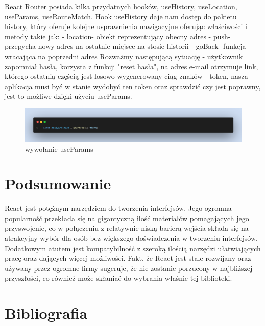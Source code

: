 \documentclass[oneside,polski,logo,indent]{amuthesis}
\begin{document}
\begin{enumerate}
\begin{enumerate}
\begin{figure}[H]
\end{figure}

React Router posiada kilka przydatnych hooków, useHistory, useLocation, useParams, useRouteMatch. Hook useHistory daje nam dostęp do pakietu history, który oferuje kolejne usprawnienia 
nawigacyjne oferując właściwości i metody takie jak:
\newline - location- obiekt reprezentujący obecny adres
\newline - push- przepycha nowy adres na ostatnie miejsce na stosie historii
\newline - goBack- funkcja wracająca na poprzedni adres
\newline
Rozważmy następującą sytuację - użytkownik zapomniał hasła, korzysta z funkcji "reset hasła", na adres e-mail otrzymuje link, którego ostatnią częścią
jest losowo wygenerowany ciąg znaków - token, nasza aplikacja musi być w stanie wydobyć ten token oraz sprawdzić czy jest poprawny, jest to możliwe dzięki użyciu useParams.
\begin{figure}[H]
\centering
\includegraphics[width=13cm]{useparams.png}
\caption{wywołanie useParams
}

\end{figure}




\pagebreak

\section{Podsumowanie}
React jest potężnym narzędziem do tworzenia interfejsów. Jego ogromna popularność przekłada się na gigantyczną ilość materiałów pomagających jego przyswojenie, co w połączeniu z relatywnie niską barierą wejścia składa się na atrakcyjny wybór dla osób bez większego doświadczenia w tworzeniu interfejsów.
Dodatkowym atutem jest kompatybilność z szeroką ilością narzędzi ułatwiających pracę oraz dających więcej możliwości. Fakt, że React jest stale rozwijany oraz używany przez ogromne firmy
sugeruje, że nie zostanie porzucony w najbliższej przyszłości, co również może skłaniać do wybrania właśnie tej biblioteki.

\section{Bibliografia}



\end{enumerate}
\end{enumerate}
\end{document}
